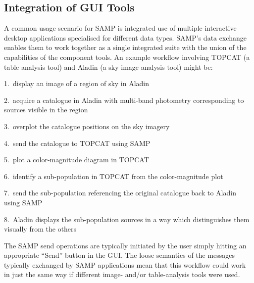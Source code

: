 \subsection{Integration of GUI Tools}

A common usage scenario for SAMP is integrated use of multiple interactive desktop applications specialised for different data types. SAMP's data exchange enables them to work together as a single integrated suite with the union of the capabilities of the component tools. An example workflow involving TOPCAT (a table analysis tool) and Aladin (a sky image analysis tool) might be: 

1.\ display an image of a region of sky in Aladin 

2.\ acquire a catalogue in Aladin with multi-band photometry corresponding to sources visible in the region

3.\ overplot the catalogue positions on the sky imagery

4.\ send the catalogue to TOPCAT using SAMP

5.\ plot a color-magnitude diagram in TOPCAT

6.\ identify a sub-population in TOPCAT from the color-magnitude plot

7.\ send the sub-population referencing the original catalogue back to Aladin using SAMP

8.\ Aladin displays the sub-population sources in a way which distinguishes them visually from the others

The SAMP send operations are typically initiated by the user simply hitting an appropriate ``Send'' button in the GUI. The loose semantics of the messages typically exchanged by SAMP applications mean that this workflow could work in just the same way if different image- and/or table-analysis tools were used.

